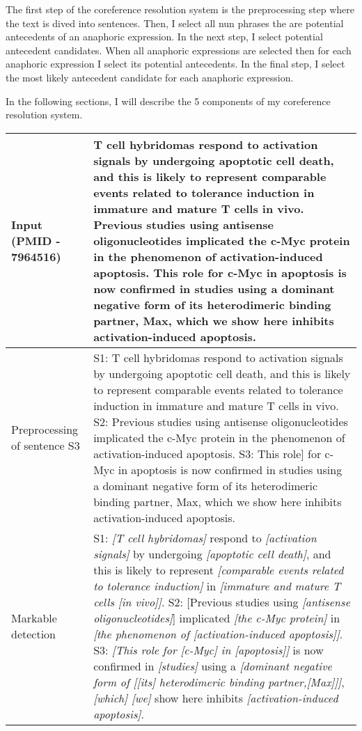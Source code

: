 The first step of the coreference resolution system is the preprocessing step where the text is dived into sentences. Then, I select all nun phrases the are potential antecedents of an anaphoric expression. In the next step, I select potential antecedent candidates. When  all anaphoric expressions  are selected then for each anaphoric expression I select its potential antecedents. In the final step, I select the most likely antecedent candidate for each anaphoric expression.   
   
In the following sections, I will describe the 5 components of my coreference resolution system. 
  
\begin{table}
   \begin{tabular}{ m{20mm} m{113mm} } 
	\footnotesize{Input (PMID - 7964516)}&\footnotesize{T cell hybridomas respond to activation signals by undergoing apoptotic cell death, and this is likely to represent comparable events related to tolerance induction in immature and mature T cells in vivo. Previous studies using antisense oligonucleotides implicated the c-Myc protein in the phenomenon of activation-induced apoptosis. This role for c-Myc in apoptosis is now confirmed in studies using a dominant negative form of its heterodimeric binding partner, Max, which we show here inhibits activation-induced apoptosis.}\\
	\hline
	\footnotesize{Preprocessing of sentence S3}&\footnotesize{S1: T cell hybridomas respond to activation signals by undergoing apoptotic cell death, and this is likely to represent comparable events related to tolerance induction in immature and mature T cells in vivo. S2: Previous studies using antisense oligonucleotides implicated the c-Myc protein in the phenomenon of activation-induced apoptosis. S3: This role] for c-Myc in apoptosis is now confirmed in studies using a dominant negative form of its heterodimeric binding partner, Max, which we show here inhibits activation-induced apoptosis.}\\
	\hline
	\footnotesize{Markable detection} &\footnotesize{S1: \textit{[T cell hybridomas]} respond to \textit{[activation signals]} by undergoing \textit{[apoptotic cell death]}, and this is likely to represent\textit{ [comparable events related to tolerance induction]} in \textit{[immature and mature T cells [in vivo]]}. S2: [Previous studies using\textit{ [antisense oligonucleotides]}] implicated\textit{ [the c-Myc protein]} in \textit{[the phenomenon of [activation-induced apoptosis]]}. S3: \textit{[This role for [c-Myc] in [apoptosis]]} is now confirmed in \textit{[studies]} using a \textit{[dominant negative form of [[its] heterodimeric binding partner,[Max]]]}, \textit{[which] [we]} show here inhibits \textit{[activation-induced apoptosis]}.}\\

\end{tabular}
\end{table}
